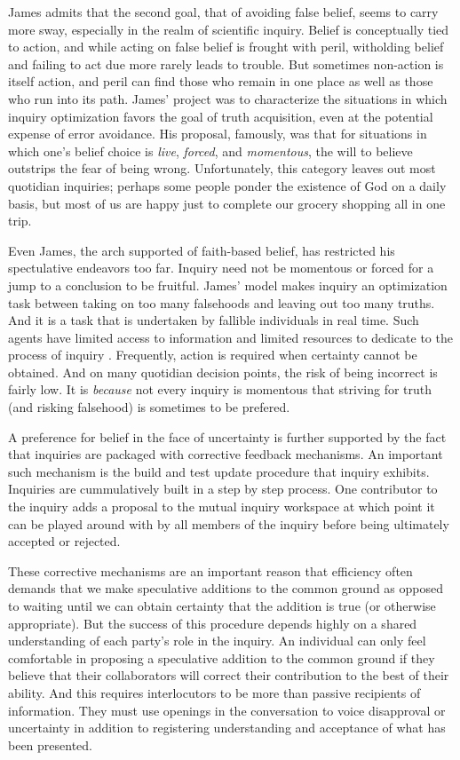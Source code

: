 \documentclass[letterpaper,]{article}
\begin{document}
James admits that the second goal, that of avoiding false belief, seems
to carry more sway, especially in the realm of scientific inquiry.
Belief is conceptually tied to action, and while acting on false belief
is frought with peril, witholding belief and failing to act due more
rarely leads to trouble. But sometimes non-action is itself action, and
peril can find those who remain in one place as well as those who run
into its path. James' project was to characterize the situations in
which inquiry optimization favors the goal of truth acquisition, even at
the potential expense of error avoidance. His proposal, famously, was
that for situations in which one's belief choice is \emph{live},
\emph{forced}, and \emph{momentous}, the will to believe outstrips the
fear of being wrong. Unfortunately, this category leaves out most
quotidian inquiries; perhaps some people ponder the existence of God on
a daily basis, but most of us are happy just to complete our grocery
shopping all in one trip.

Even James, the arch supported of faith-based belief, has restricted his
spectulative endeavors too far. Inquiry need not be momentous or forced
for a jump to a conclusion to be fruitful. James' model makes inquiry an
optimization task between taking on too many falsehoods and leaving out
too many truths. And it is a task that is undertaken by fallible
individuals in real time. Such agents have limited access to information
and limited resources to dedicate to the process of inquiry
\autocite{bratman1988}. Frequently, action is required when certainty
cannot be obtained. And on many quotidian decision points, the risk of
being incorrect is fairly low. It is \emph{because} not every inquiry is
momentous that striving for truth (and risking falsehood) is sometimes
to be prefered.

A preference for belief in the face of uncertainty is further supported
by the fact that inquiries are packaged with corrective feedback
mechanisms. An important such mechanism is the build and test update
procedure that inquiry exhibits. Inquiries are cummulatively built in a
step by step process. One contributor to the inquiry adds a proposal to
the mutual inquiry workspace at which point it can be played around with
by all members of the inquiry before being ultimately accepted or
rejected.

These corrective mechanisms are an important reason that efficiency
often demands that we make speculative additions to the common ground as
opposed to waiting until we can obtain certainty that the addition is
true (or otherwise appropriate). But the success of this procedure
depends highly on a shared understanding of each party's role in the
inquiry. An individual can only feel comfortable in proposing a
speculative addition to the common ground if they believe that their
collaborators will correct their contribution to the best of their
ability. And this requires interlocutors to be more than passive
recipients of information. They must use openings in the conversation to
voice disapproval or uncertainty in addition to registering
understanding and acceptance of what has been presented.
\end{document}
